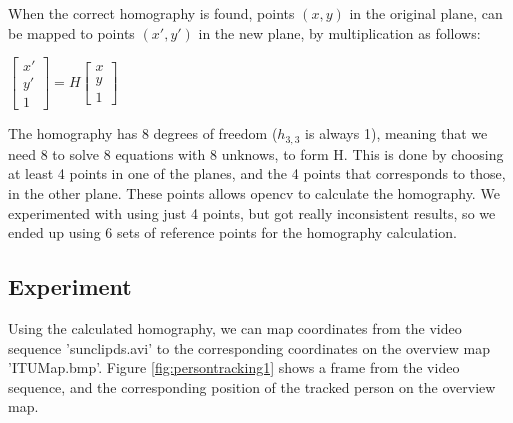 \documentclass[a4paper,11pt]{article}
\begin{document}
When the correct homography is found, points $(x,y)$ in the original plane, can be mapped to points $(x',y')$ in the new plane, by multiplication as follows:

\begin{center}
$
\begin{bmatrix}
x' \\
y' \\
1
\end{bmatrix}
= H
\begin{bmatrix}
x \\
y \\
1
\end{bmatrix}
$
\end{center}

The homography has 8 degrees of freedom ($h_{3,3}$ is always 1), meaning that we need 8 to solve 8 equations with 8 unknows, to form H. This is done by choosing at least 4 points in one of the planes, and the 4 points that corresponds to those, in the other plane. These points allows opencv to calculate the homography. We experimented with using just 4 points, but got really inconsistent results, so we ended up using 6 sets of reference points for the homography calculation.

\subsection{Experiment}
Using the calculated homography, we can map coordinates from the video sequence 'sunclipds.avi' to the corresponding coordinates on the overview map 'ITUMap.bmp'. Figure \ref{fig:persontracking1} shows a frame from the video sequence, and the corresponding position of the tracked person on the overview map.
\end{document}
